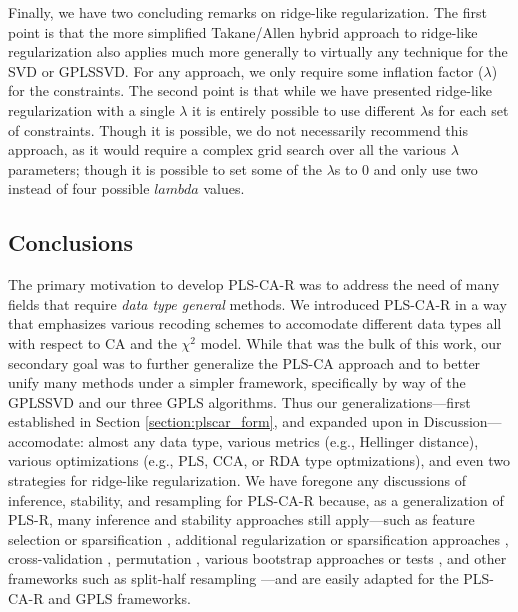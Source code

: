 \documentclass[12pt]{article}
\begin{document}
Finally, we have two concluding remarks on ridge-like regularization.
The first point is that the more simplified Takane/Allen hybrid approach
to ridge-like regularization also applies much more generally to
virtually any technique for the SVD or GPLSSVD. For any approach, we
only require some inflation factor (\(\lambda\)) for the constraints.
The second point is that while we have presented ridge-like
regularization with a single \(\lambda\) it is entirely possible to use
different \(\lambda\)s for each set of constraints. Though it is
possible, we do not necessarily recommend this approach, as it would
require a complex grid search over all the various \(\lambda\)
parameters; though it is possible to set some of the \(\lambda\)s to 0
and only use two instead of four possible \(lambda\) values.

\hypertarget{conclusions}{%
\subsection{Conclusions}\label{conclusions}}

The primary motivation to develop PLS-CA-R was to address the need of
many fields that require \textit{data type general} methods. We
introduced PLS-CA-R in a way that emphasizes various recoding schemes to
accomodate different data types all with respect to CA and the
\(\chi^2\) model. While that was the bulk of this work, our secondary
goal was to further generalize the PLS-CA approach and to better unify
many methods under a simpler framework, specifically by way of the
GPLSSVD and our three GPLS algorithms. Thus our generalizations---first
established in Section \ref{section:plscar_form}, and expanded upon in
Discussion---accomodate: almost any data type, various metrics (e.g.,
Hellinger distance), various optimizations (e.g., PLS, CCA, or RDA type
optmizations), and even two strategies for ridge-like regularization. We
have foregone any discussions of inference, stability, and resampling
for PLS-CA-R because, as a generalization of PLS-R, many inference and
stability approaches still apply---such as feature selection or
sparsification \citep{sutton_sparse_2018}, additional regularization or
sparsification approaches
\citep{le_floch_significant_2012-1, guillemot2019constrained, tenenhaus_variable_2014, tenenhaus_regularized_2011},
cross-validation
\citep{wold_principal_1987, rodriguez-perez_overoptimism_2018, kvalheim_number_2019, abdi_partial_2010-1},
permutation \citep{berry_permutation_2011}, various bootstrap
\citep{efron_bootstrap_1979, chernick_bootstrap_2008} approaches
\citep{abdi_partial_2010-1, takane_regularized_2009-1} or tests
\citep{mcintosh_partial_2004, krishnan_partial_2011}, and other
frameworks such as split-half resampling
\citep{strother_quantitative_2002-1, kovacevic2013revisiting, strother2004optimizing}---and
are easily adapted for the PLS-CA-R and GPLS frameworks.
\end{document}
